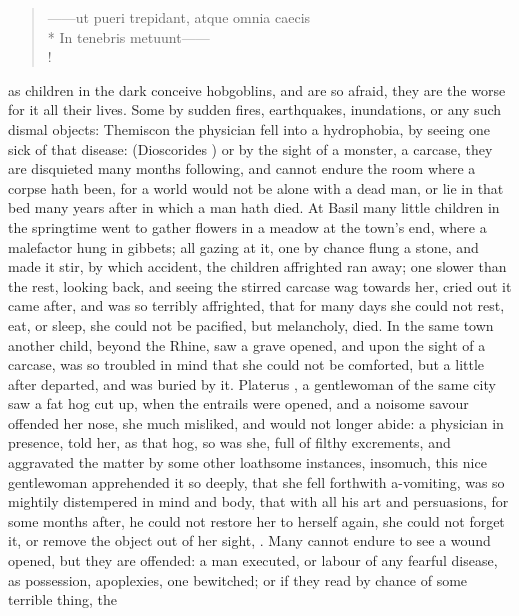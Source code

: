 \begin{latin}
\begin{verse}%
------ut pueri trepidant, atque omnia caecis\\*
In tenebris metuunt------\\!
\end{verse}%
\end{latin}
as children in the dark conceive hobgoblins, and are so afraid, they are the
worse for it all their lives. Some by sudden fires, earthquakes, inundations,
or any such dismal objects: Themiscon the physician fell into a hydrophobia, by
seeing one sick of that disease: (Dioscorides ) or by the sight of a monster, a carcase, they are disquieted many months
following, and cannot endure the room where a corpse hath been, for a world
would not be alone with a dead man, or lie in that bed many years after in
which a man hath died. At Basil many little children in
the springtime went to gather flowers in a meadow at the town's end, where a
malefactor hung in gibbets; all gazing at it, one by chance flung a stone, and
made it stir, by which accident, the children affrighted ran away; one slower
than the rest, looking back, and seeing the stirred carcase wag towards her,
cried out it came after, and was so terribly affrighted, that for many days she
could not rest, eat, or sleep, she could not be pacified, but melancholy, died.
In the same town another child, beyond the Rhine, saw a
grave opened, and upon the sight of a carcase, was so troubled in mind that she
could not be comforted, but a little after departed, and was buried by it.
Platerus , a gentlewoman of the same city
saw a fat hog cut up, when the entrails were opened, and a noisome savour
offended her nose, she much misliked, and would not longer abide: a physician
in presence, told her, as that hog, so was she, full of filthy excrements, and
aggravated the matter by some other loathsome instances, insomuch, this nice
gentlewoman apprehended it so deeply, that she fell forthwith a-vomiting, was
so mightily distempered in mind and body, that with all his art and
persuasions, for some months after, he could not restore her to herself again,
she could not forget it, or remove the object out of her sight, . Many
cannot endure to see a wound opened, but they are offended: a man executed, or
labour of any fearful disease, as possession, apoplexies, one bewitched;
or if they read by chance of some terrible thing, the
